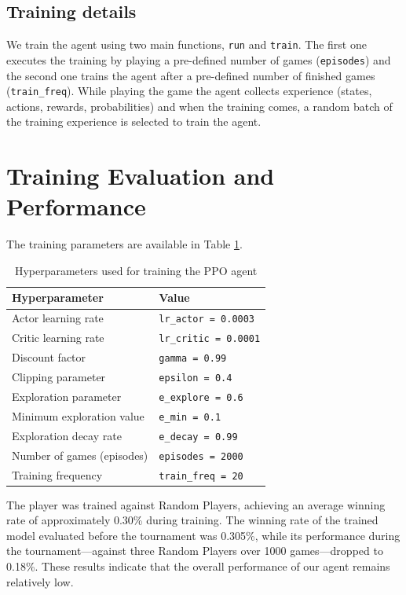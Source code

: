 \documentclass{article}
\begin{document}
\subsection{Training details}
We train the agent using two main functions, \texttt{run} and  \texttt{train}. The first one executes the training by playing a pre-defined number of games (\texttt{episodes}) and the second one trains the agent after a pre-defined number of finished games (\texttt{train\_freq}). While playing the game the agent collects experience (states, actions, rewards, probabilities) and when the training comes, a random batch of the training experience is selected to train the agent.


\section{Training Evaluation and Performance}
The training parameters are available in Table \ref{tab:train}.

\begin{table}[h]
\centering
\begin{tabular}{l l}
\textbf{Hyperparameter} & \textbf{Value} \\
\hline
Actor learning rate & \texttt{lr\_actor = 0.0003} \\
Critic learning rate & \texttt{lr\_critic = 0.0001} \\
Discount factor & \texttt{gamma = 0.99} \\
Clipping parameter & \texttt{epsilon = 0.4} \\
Exploration parameter & \texttt{e\_explore = 0.6} \\
Minimum exploration value & \texttt{e\_min = 0.1} \\
Exploration decay rate & \texttt{e\_decay = 0.99} \\
Number of games (episodes) & \texttt{episodes = 2000} \\
Training frequency & \texttt{train\_freq = 20} \\
\end{tabular}
\caption{Hyperparameters used for training the PPO agent}
\label{tab:train}
\end{table}


The player was trained against Random Players, achieving an average winning rate of approximately 0.30\% during training. The winning rate of the trained model evaluated before the tournament was 0.305\%, while its performance during the tournament—against three Random Players over 1000 games—dropped to 0.18\%. These results indicate that the overall performance of our agent remains relatively low.
\end{document}
